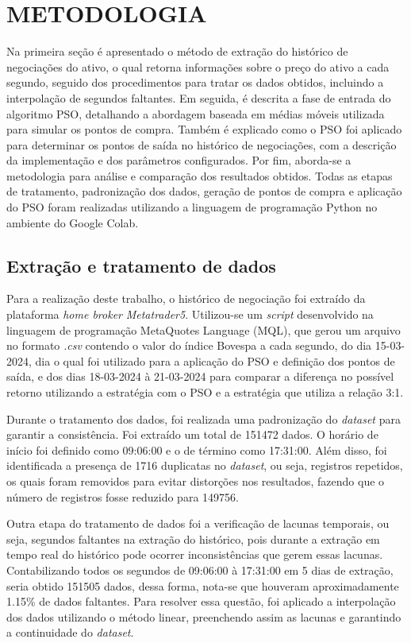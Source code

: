 \documentclass{iftex2024}
\begin{document}
\chapter{METODOLOGIA}

Na primeira seção é apresentado o método de extração do histórico de negociações do ativo, o qual 
retorna informações sobre o preço do ativo a cada segundo, seguido dos procedimentos para tratar os dados obtidos, 
incluindo a interpolação de segundos faltantes. Em seguida, é descrita a fase de entrada do algoritmo PSO, 
detalhando a abordagem baseada em médias móveis utilizada para simular os pontos de compra. Também é explicado 
como o PSO foi aplicado para determinar os pontos de saída no histórico de negociações, com a descrição da implementação 
e dos parâmetros configurados. Por fim, aborda-se a metodologia para análise e comparação dos resultados obtidos. 
Todas as etapas de tratamento, padronização dos dados, geração de pontos
de compra e aplicação do PSO foram realizadas utilizando a linguagem de programação
Python no ambiente do Google Colab.

\section{Extração e tratamento de dados}

Para a realização deste trabalho, o histórico de negociação foi extraído da
plataforma \textit{home broker} \textit{Metatrader5}. Utilizou-se um \textit{script} desenvolvido na linguagem
de programação MetaQuotes Language (MQL), que gerou um arquivo no formato \textit{.csv}
contendo o valor do índice Bovespa a cada segundo, do dia 15-03-2024, dia o qual foi utilizado
para a aplicação do PSO e definição dos pontos de saída, e dos dias 18-03-2024 à 21-03-2024 para comparar 
a diferença no possível retorno utilizando a estratégia com o PSO e a estratégia que utiliza a relação 3:1.

Durante o tratamento dos dados, foi realizada uma padronização do \textit{dataset}
para garantir a consistência. Foi extraído um total de 151472 dados. O horário de início foi definido como 09:06:00 e o
de término como 17:31:00. Além disso, foi identificada a presença de 1716 duplicatas no \textit{dataset},
ou seja, registros repetidos, os quais foram removidos para evitar distorções nos resultados, fazendo que o número
de registros fosse reduzido para 149756.

Outra etapa do tratamento de dados foi a verificação de lacunas temporais, ou seja, segundos faltantes na extração do histórico,
pois durante a extração em tempo real do histórico pode ocorrer inconsistências que gerem essas lacunas.
Contabilizando todos os segundos de 09:06:00 à 17:31:00 em 5 dias de extração, seria obtido 151505 dados,
dessa forma, nota-se que houveram aproximadamente 1.15\% de dados faltantes. Para resolver essa questão,
foi aplicado a interpolação dos dados utilizando o método linear, preenchendo assim as
lacunas e garantindo a continuidade do \textit{dataset}. 
\end{document}
